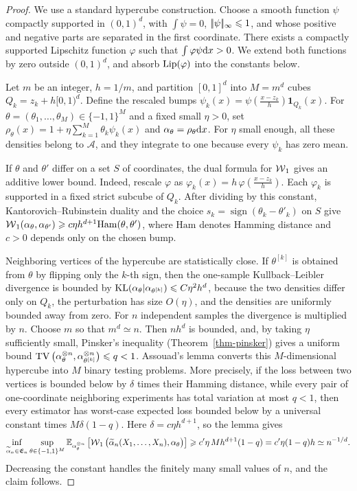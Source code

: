 \begin{proof}
We use a standard hypercube construction. Choose a smooth function \(\psi\) compactly supported in \((0,1)^d\), with \(\int\psi=0\), \(|\!| \psi |\!|_\infty\leqslant1\), and whose positive and negative parts are separated in the first coordinate. There exists a compactly supported Lipschitz function \(\varphi\) such that \(\int\varphi\psi\mathrm{d} x>0\). We extend both functions by zero outside \((0,1)^d\), and absorb \(\operatorname{Lip}(\varphi)\) into the constants below.

Let \(m\) be an integer, \(h=1/m\), and partition \([0,1]^d\) into \(M=m^d\) cubes \(Q_k=z_k+h[0,1)^d\). Define the rescaled bumps
$\psi_k(x)=\psi\!\left(\frac{x-z_k}{h}\right)\mathbf 1_{Q_k}(x)$.
For \(\theta=(\theta_1,\ldots,\theta_M)\in\{-1,1\}^M\) and a fixed small \(\eta>0\), set
$\rho_\theta(x)=1+\eta\sum_{k=1}^M\theta_k\psi_k(x)$ and $\alpha_\theta=\rho_\theta\mathrm{d} x$.
For \(\eta\) small enough, all these densities belong to \(\mathcal A\), and they integrate to one because every \(\psi_k\) has zero mean.

If \(\theta\) and \(\theta'\) differ on a set \(S\) of coordinates, the dual formula for \(\operatorname{\mathcal{W}}_1\) gives an additive lower bound. Indeed, rescale \(\varphi\) as
\(\varphi_k(x)=h\,\varphi\!\left(\frac{x-z_k}{h}\right)\).
Each \(\varphi_k\) is supported in a fixed strict subcube of \(Q_k\). After dividing by this constant, Kantorovich--Rubinstein duality and the choice \(s_k=\operatorname{sign}(\theta_k-\theta'_k)\) on \(S\) give \(\operatorname{\mathcal{W}}_1(\alpha_\theta,\alpha_{\theta'})\geqslant c\eta h^{d+1}\mathrm{Ham}(\theta,\theta')\), where \(\mathrm{Ham}\) denotes Hamming distance and \(c>0\) depends only on the chosen bump.

Neighboring vertices of the hypercube are statistically close. If \(\theta^{[k]}\) is obtained from \(\theta\) by flipping only the \(k\)-th sign, then the one-sample Kullback--Leibler divergence is bounded by
$\operatorname{KL}(\alpha_\theta|\alpha_{\theta^{[k]}}) \leqslant C\eta^2 h^d$,
because the two densities differ only on \(Q_k\), the perturbation has size \(O(\eta)\), and the densities are uniformly bounded away from zero. For \(n\) independent samples the divergence is multiplied by \(n\). Choose \(m\) so that \(m^d\simeq n\). Then \(n h^d\) is bounded, and, by taking \(\eta\) sufficiently small, Pinsker's inequality (Theorem~\ref{thm-pinsker}) gives a uniform bound
$\operatorname{TV}\big(\alpha_\theta^{\otimes n},\alpha_{\theta^{[k]}}^{\otimes n}\big) \leqslant q<1$.
Assouad's lemma converts this \(M\)-dimensional hypercube into \(M\) binary testing problems. More precisely, if the loss between two vertices is bounded below by \(\delta\) times their Hamming distance, while every pair of one-coordinate neighboring experiments has total variation at most \(q<1\), then every estimator has worst-case expected loss bounded below by a universal constant times \(M\delta(1-q)\). Here \(\delta=c\eta h^{d+1}\), so the lemma gives
\[
\inf_{\widetilde\alpha_n\in\mathfrak E_n}
\sup_{\theta\in\{-1,1\}^M}
\mathbb{E}_{\alpha_\theta^{\otimes n}}
\left[
\operatorname{\mathcal{W}}_1\big(\widetilde\alpha_n(X_1,\ldots,X_n),\alpha_\theta\big)
\right]
\geqslant
c'\eta\,M h^{d+1}(1-q)
=
c'\eta(1-q)h
\simeq
n^{-1/d}.
\]
Decreasing the constant handles the finitely many small values of \(n\), and the claim follows.
\end{proof}
